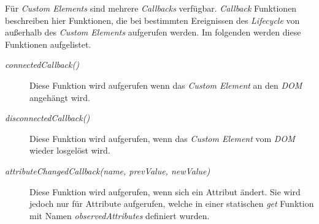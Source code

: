 \documentclass[12pt, paper=a4, bibtotoc, toc=listof]{scrreprt}
\begin{document}
			Für \emph{Custom Elements} sind mehrere \emph{Callbacks} verfügbar. \emph{Callback} Funktionen beschreiben hier Funktionen, die bei bestimmten Ereignissen des \emph{Lifecycle} von außerhalb des \emph{Custom Elements} aufgerufen werden. Im folgenden werden diese Funktionen aufgelistet.
			\begin{description}  
				\item  [\emph{connectedCallback()}] Diese Funktion wird aufgerufen wenn das \emph{Custom Element} an den \emph{\ac{DOM}} angehängt wird.
				\item [\emph{disconnectedCallback()}] Diese Funktion wird aufgerufen, wenn das \emph{Custom Element} vom \emph{\ac{DOM}} wieder losgelöst wird. 
				\item  [\emph{attributeChangedCallback(name, prevValue, newValue)}] Diese Funktion wird aufgerufen, wenn sich ein Attribut ändert. Sie wird jedoch nur für Attribute aufgerufen, welche in einer statischen \emph{get} Funktion mit Namen \emph{observedAttributes} definiert wurden.
			\end{description}
\end{document}
